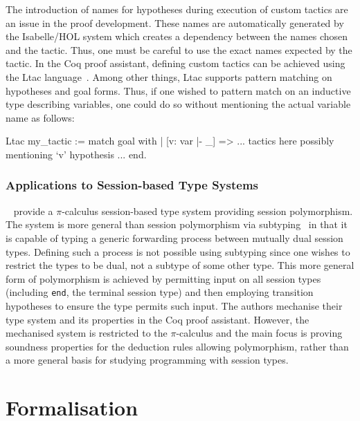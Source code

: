 \documentclass{mpaper}
\begin{document}
The introduction of names for hypotheses during execution of custom tactics
are an issue in the proof development. These names are automatically generated
by the Isabelle/HOL system which creates a dependency between the names chosen
and the tactic. Thus, one must be careful to use the exact names expected by
the tactic. In the Coq proof assistant, defining custom tactics can be
achieved using the Ltac language~\cite{Delahaye:2000:TLS}. Among other things,
Ltac supports pattern matching on hypotheses and goal forms. Thus, if one
wished to pattern match on an inductive type describing variables, one could
do so without mentioning the actual variable name as follows:

\begin{coq}
Ltac my_tactic :=
  match goal with
  | [v: var |- _] =>
    ... tactics here possibly mentioning `v' hypothesis ...
  end.
\end{coq}

\subsubsection{Applications to Session-based Type Systems}\label{sec:asts}

\citeauthor{Goto:2014}~\cite{Goto:2014} provide a $\pi$-calculus session-based
type system providing session polymorphism. The system is more general than
session polymorphism via subtyping~\cite{Gay:2005:SST} in that it is capable
of typing a generic forwarding process between mutually dual session
types. Defining such a process is not possible using subtyping since one
wishes to restrict the types to be dual, not a subtype of some other
type. This more general form of polymorphism is achieved by permitting input
on all session types (including \lstinline{end}, the terminal session type)
and then employing transition hypotheses to ensure the type permits such
input. The authors mechanise their type system and its properties in the Coq
proof assistant. However, the mechanised system is restricted to the
$\pi$-calculus and the main focus is proving soundness properties for the
deduction rules allowing polymorphism, rather than a more general basis for
studying programming with session types.

\section{Formalisation}
\end{document}
